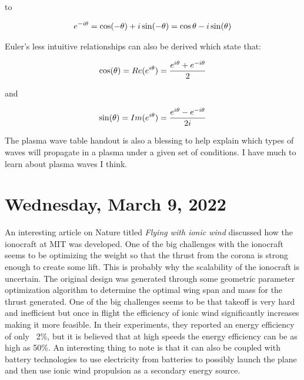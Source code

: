 \documentclass[12pt]{article}
\begin{document}
to 

\begin{equation}
\centering
e^{-i\theta} = \cos(-\theta) + i \sin(-\theta) = \cos{\theta} - i\sin(\theta)
\end{equation}

Euler's less intuitive relationships can also be derived which state that:

\begin{equation}
\centering
\cos(\theta) = Re(e^{i\theta}) = \frac{e^{i\theta}+e^{-i\theta}}{2}
\end{equation}

and

\begin{equation}
\centering
\sin(\theta) = Im(e^{i\theta}) = \frac{e^{i\theta} - e^{-i\theta}}{2i}
\end{equation}

The plasma wave table handout is also a blessing to help explain which types of waves will propagate in a plasma under a given set of conditions. I have much to learn about plasma waves I think. 

\section{Wednesday, March 9, 2022}

\par
An interesting article on Nature titled \textit{Flying with ionic wind} discussed how the ionocraft at MIT was developed. One of the big challenges with the ionocraft seems to be optimizing the weight so that the thrust from the corona is strong enough to create some lift.  This is probably why the scalability of the ionocraft is uncertain.  The original design was generated through some geometric parameter optimization algorithm to determine the optimal wing span and mass for the thrust generated.  One of the big challenges seems to be that takeoff is very hard and inefficient but once in flight the efficiency of ionic wind significantly increases making it more feasible. In their experiments, they reported an energy efficiency of only ~2\%, but it is believed that at high speeds the energy efficiency can be as high as 50\%. An interesting thing to note is that it can also be coupled with battery technologies to use electricity from batteries to possibly launch the plane and then use ionic wind propulsion as a secondary energy source.
\end{document}

